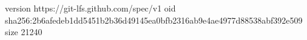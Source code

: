 version https://git-lfs.github.com/spec/v1
oid sha256:2b6afedeb1dd5451b2b36d49145ea0bfb2316ab9e4ae4977d88538abf392e509
size 21240
